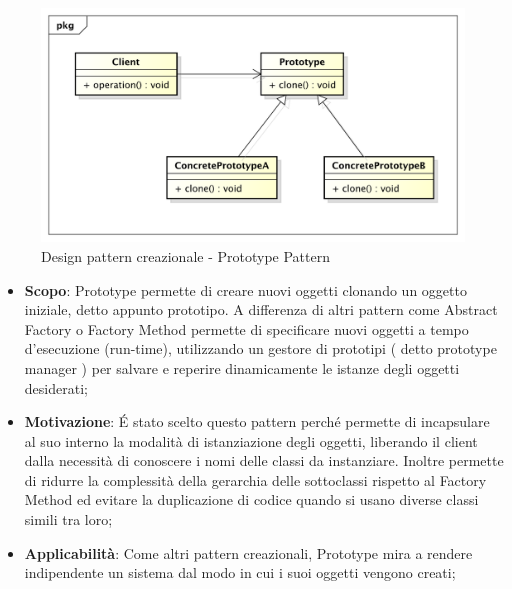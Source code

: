 		\begin{figure}[htbp]
			\centering
			\centerline{\includegraphics[scale=0.5]{./images/designpatternappendice/prototype.pdf}}
			\caption{Design pattern creazionale - Prototype Pattern}
		\end{figure}

		\begin{itemize}
			\item \textbf{Scopo}: Prototype permette di creare nuovi oggetti clonando un oggetto iniziale, detto appunto prototipo. A differenza di altri pattern come Abstract Factory o Factory Method permette di specificare nuovi oggetti a tempo d'esecuzione (run-time), utilizzando un gestore di prototipi ( detto prototype manager ) per salvare e reperire dinamicamente le istanze degli oggetti desiderati;

			\item \textbf{Motivazione}: \'E stato scelto questo pattern perché permette di incapsulare al suo interno la modalità di istanziazione degli oggetti, liberando il client dalla necessità di conoscere i nomi delle classi da instanziare. Inoltre permette di ridurre la complessità della gerarchia delle sottoclassi rispetto al Factory Method ed evitare la duplicazione di codice quando si usano diverse classi simili tra loro;

			\item \textbf{Applicabilità}: Come altri pattern creazionali, Prototype mira a rendere indipendente un sistema dal modo in cui i suoi oggetti vengono creati;

		\end{itemize}

		\newpage
